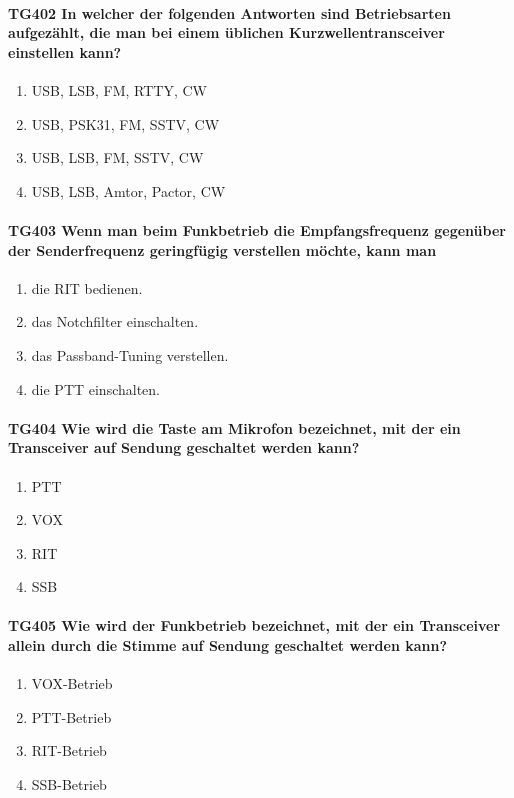 \documentclass[8pt]{article}
\begin{document}
\paragraph*{TG402 In welcher der folgenden Antworten sind Betriebsarten aufgezählt, die man bei einem üblichen Kurzwellentransceiver einstellen kann?}
\begin{enumerate}[nolistsep,label=\Alph*]
\item USB, LSB, FM, RTTY, CW
\item USB, PSK31, FM, SSTV, CW
\item USB, LSB, FM, SSTV, CW
\item USB, LSB, Amtor, Pactor, CW
\end{enumerate}

\paragraph*{TG403 Wenn man beim Funkbetrieb die Empfangsfrequenz gegenüber der Senderfrequenz geringfügig verstellen möchte, kann man}
\begin{enumerate}[nolistsep,label=\Alph*]
\item die RIT bedienen.
\item das Notchfilter einschalten.
\item das Passband-Tuning verstellen.
\item die PTT einschalten.
\end{enumerate}

\paragraph*{TG404 Wie wird die Taste am Mikrofon bezeichnet, mit der ein Transceiver auf Sendung geschaltet werden kann?}
\begin{enumerate}[nolistsep,label=\Alph*]
\item PTT
\item VOX
\item RIT
\item SSB
\end{enumerate}

\paragraph*{TG405 Wie wird der Funkbetrieb bezeichnet, mit der ein Transceiver allein durch die Stimme auf Sendung geschaltet werden kann?}
\begin{enumerate}[nolistsep,label=\Alph*]
\item VOX-Betrieb
\item PTT-Betrieb
\item RIT-Betrieb
\item SSB-Betrieb
\end{enumerate}
\end{document}

